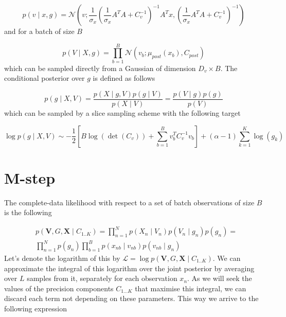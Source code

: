 \documentclass{paper}
\begin{document}
\begin{equation}
p(v \mid x,g) = \mathcal{N}\left(v; \frac{1}{\sigma_x} \left(\frac{1}{\sigma_x} A^T A + C_v^{-1}\right)^{-1} A^T x, \left(\frac{1}{\sigma_x} A^T A + C_v^{-1}\right)^{-1}\right)
\end{equation}
%
and for a batch of size $B$

\begin{equation}
p(V \mid X,g) = \prod_{b=1}^B \mathcal{N} \left(v_b; \mu_{post}(x_b),C_{post} \right)
\end{equation}
%
which can be sampled directly from a Gaussian of dimension $D_v \times B$. The conditional posterior over $g$ is defined as follows

\begin{equation} 
p(g \mid X,V) = \frac{p(X \mid g,V) p(g \mid V)}{p(X \mid V)} = \frac{p(V \mid g) p(g)}{p(V)}
\end{equation}
%
which can be sampled by a  slice sampling scheme with the following target

\begin{equation} 
\log p(g \mid X,V) \sim -\frac{1}{2} \left[B\log(\det(C_v)) + \sum_{b=1}^B v_b^T C_v^{-1} v_b\right] + (\alpha-1) \sum_{k=1}^K \log(g_k)
\end{equation}

\section{M-step}

The complete-data likelihood with respect to a set of batch observations of size $B$ is the following

\begin{equation}
\begin{split}
&p(\mathbf{V},G,\mathbf{X} \mid C_{1..K}) = \prod_{n=1}^N p(X_n \mid V_n) p(V_n \mid g_n) p(g_n) = \\
&\prod_{n=1}^N p(g_n) \prod_{b=1}^B p(x_{nb} \mid v_{nb}) p(v_{nb} \mid g_n) 
\end{split}
\end{equation}
%
Let's denote the logarithm of this by $\mathcal{L}=\log p(\mathbf{V},G,\mathbf{X} \mid C_{1..K})$. We can approximate the integral of this logarithm over the joint posterior by averaging over $L$ samples from it, separately for each observation $x_n$. As we will seek the values of the precision components $C_{1 \dots K}$ that maximise this integral, we can discard each term not depending on these parameters. This way we arrive to the following expression 
\end{document}
